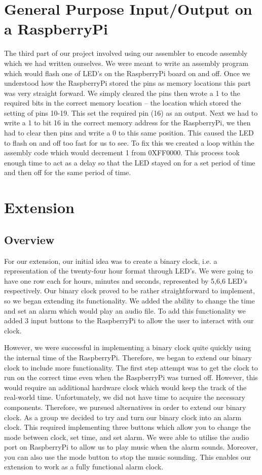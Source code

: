 \documentclass[11pt]{article}
\begin{document}
\section{General Purpose Input/Output on a RaspberryPi}
The third part of our project involved using our assembler to encode assembly which we had written ourselves. We were meant to write an assembly program which would flash one of LED’s on the RaspberryPi board on and off. Once we understood how the RaspberryPi stored the pins as memory locations this part was very straight forward. We simply cleared the pins then wrote a 1 to the required bits in the correct memory location – the location which stored the setting of pins 10-19. This set the required pin (16) as an output. Next we had to write a 1 to bit 16 in the correct memory address for the RaspberryPi, we then had to clear then pins and write a 0 to this same position. This caused the LED to flash on and off too fast for us to see. To fix this we created a loop within the assembly code which would decrement 1 from 0XFF0000. This process took enough time to act as a delay so that the LED stayed on for a set period of time and then off for the same period of time.

\section{Extension}
\subsection{Overview}
For our extension, our initial idea was to create a binary clock, i.e. a representation of the twenty-four hour format through LED’s. We were going to have one row each for hours, minutes and seconds, represented by 5,6,6 LED's respectively. Our binary clock proved to be rather straightforward to implement, so we began extending its functionality. We added the ability to change the time and set an alarm which would play an audio file. To add this functionality we added 3 input buttons to the RaspberryPi to allow the user to interact with our clock.

However, we were successful in implementing a binary clock quite quickly using the internal time of the RaspberryPi. Therefore, we began to extend our binary clock to include more functionality. The first step attempt was to get the clock to run on the correct time even when the RaspberryPi was turned off. However, this would require an additional hardware clock which would keep the track of the real-world time. Unfortunately, we did not have time to acquire the necessary components. Therefore, we pursued alternatives in order to extend our binary clock. As a group we decided to try and turn our binary clock into an alarm clock. This required implementing three buttons which allow you to change the mode between clock, set time, and set alarm. We were able to utilise the audio port on RaspberryPi to allow us to play music when the alarm sounds. Moreover, you can also use the mode button to stop the music sounding. This enables our extension to work as a fully functional alarm clock.
\end{document}
